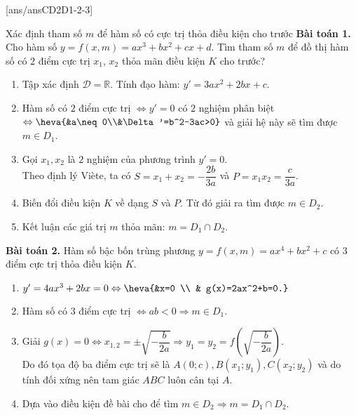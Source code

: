 \newpage
{}[ans/ansCD2D1-2-3]
\begin{dang}{Xác định tham số $m$ để hàm số có cực trị thỏa điều kiện cho trước}
\noindent \textbf{Bài toán 1.} Cho hàm số $y=f(x,m)=ax^3+bx^2+cx+d$. Tìm tham số $m$ để đồ thị hàm số có $2$ điểm cực trị $x_1$, $x_2$ thỏa mãn điều kiện $K$ cho trước?
\begin{enumerate}[\bf Bước 1.]
	\item Tập xác định $\mathscr{D}=\mathbb{R}$. Tính đạo hàm: $y'=3ax^2+2bx+c$.
	\item Hàm số có $2$ điểm cực trị $\Leftrightarrow y'=0$ có $2$ nghiệm phân biệt
	$\Leftrightarrow\heva{&a\neq 0\\&\Delta'=b^2-3ac>0}$ và giải hệ này sẽ tìm được $m\in D_1$.
	\item Gọi $x_1, x_2$ là $2$ nghiệm của phương trình $y'=0$.\\
	Theo định lý Viète, ta có $S=x_1+x_2=-\dfrac{2b}{3a}$ và $P=x_1x_2=\dfrac{c}{3a}$.
	\item Biến đổi điều kiện $K$ về dạng $S$ và $P$. Từ đó giải ra tìm được $m\in D_2$.
	\item Kết luận các giá trị $m$ thỏa mãn: $m=D_1\cap D_2$.
\end{enumerate}
\textbf{Bài toán 2.} Hàm số bậc bốn trùng phương $y=f(x,m)=ax^4+bx^2+c$ có $3$ điểm cực trị thỏa điều kiện $K$.
\begin{enumerate}[\bf Bước 1.]
	\item $y'=4ax^3+2bx=0 \Leftrightarrow \heva{&x=0 \\ & g(x)=2ax^2+b=0.}$
	\item Hàm số có $3$ điểm cực trị $\Leftrightarrow ab<0 \Rightarrow m\in D_1$.
	\item Giải $g(x)=0\Leftrightarrow x_{1,2}=\pm\sqrt{-\dfrac{b}{2a}}\Rightarrow y_1=y_2=f\left(\sqrt{-\dfrac{b}{2a}}\right)$.\\
	Do đó tọa độ ba điểm cực trị sẽ là $A(0;c), B(x_1;y_1), C(x_2;y_2)$ và do tính đối xứng nên tam giác $ABC$ luôn cân tại $A$.
	\item Dựa vào điều kiện đề bài cho để tìm $m\in D_2\Rightarrow m=D_1\cap D_2$.
\end{enumerate}
\end{dang}
